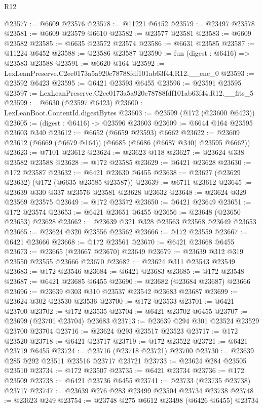 \begin{lexlean}{R12}
\begin{coremodule}
@23577 := @6609 @23576
@23578 := @11221 @6452
@23579 := @23497 @23578
@23581 := @6609 @23579 @6610
@23582 := @23577 @23581
@23583 := @6609 @23582
@23585 := @6635 @23572 @23574
@23586 := @6631 @23585
@23587 := @11224 @6452
@23588 := @23586 @23587
@23590 := fun (digest : @6416) => @23583 @23588
@23591 := @6620 @164
@23592 := LexLeanPreserve.C2ee0173a5a920c78788fdf101ab63f44.R12.__enc_0
@23593 := @23592 @6423
@23595 := @6421 @23593 @6455
@23596 := @23591 @23595
@23597 := LexLeanPreserve.C2ee0173a5a920c78788fdf101ab63f44.R12.__fits_5
@23599 := @6630 (@23597 @6423)
@23600 := LexLeanBoot.ContentId.digestBytes
@23603 := @23599 (@172 (@23600 @6423))
@23605 := (digest : @6416) -> @23596 @23603
@23609 := @6644 @164 @23595 @23603 @340
@23612 := @6652 (@6659 @23593) @6662
@23622 := @23609 @23612 (@6669 (@6679 @164)) (@6685 (@6686 (@6687 @340) @23595 @6662))
@23623 := @7101 @23612
@23624 := @23623 @118
@23627 := @23624 @338 @23582 @23588
@23628 := @172 @23585
@23629 := @6421 @23628
@23630 := @172 @23587
@23632 := @6421 @23630 @6455
@23638 := @23627 (@23629 @23632) (@172 (@6635 @23585 @23587))
@23639 := @6711 @23612
@23645 := @23639 @330 @337 @23576 @23581 @23628 @23632
@23648 := @23624 @329 @23569 @23575
@23649 := @172 @23572
@23650 := @6421 @23649
@23651 := @172 @23574
@23653 := @6421 @23651 @6455
@23656 := @23648 (@23650 @23653) @23628
@23662 := @23639 @321 @328 @23563 @23568 @23649 @23653
@23665 := @23624 @320 @23556 @23562
@23666 := @172 @23559
@23667 := @6421 @23666
@23668 := @172 @23561
@23670 := @6421 @23668 @6455
@23673 := @23665 (@23667 @23670) @23649
@23679 := @23639 @312 @319 @23550 @23555 @23666 @23670
@23682 := @23624 @311 @23543 @23549
@23683 := @172 @23546
@23684 := @6421 @23683
@23685 := @172 @23548
@23687 := @6421 @23685 @6455
@23690 := @23682 (@23684 @23687) @23666
@23696 := @23639 @303 @310 @23537 @23542 @23683 @23687
@23699 := @23624 @302 @23530 @23536
@23700 := @172 @23533
@23701 := @6421 @23700
@23702 := @172 @23535
@23704 := @6421 @23702 @6455
@23707 := @23699 (@23701 @23704) @23683
@23713 := @23639 @294 @301 @23524 @23529 @23700 @23704
@23716 := @23624 @293 @23517 @23523
@23717 := @172 @23520
@23718 := @6421 @23717
@23719 := @172 @23522
@23721 := @6421 @23719 @6455
@23724 := @23716 (@23718 @23721) @23700
@23730 := @23639 @285 @292 @23511 @23516 @23717 @23721
@23733 := @23624 @284 @23505 @23510
@23734 := @172 @23507
@23735 := @6421 @23734
@23736 := @172 @23509
@23738 := @6421 @23736 @6455
@23741 := @23733 (@23735 @23738) @23717
@23747 := @23639 @276 @283 @23499 @23504 @23734 @23738
@23748 := @23623 @249
@23754 := @23748 @275 @6612 @23498 (@6426 @6455) @23734

\end{coremodule}
\end{lexlean}
